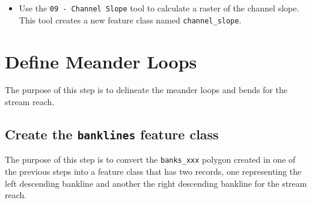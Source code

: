 \documentclass[]{book}
\providecommand{\tightlist}{%
  \setlength{\itemsep}{0pt}\setlength{\parskip}{0pt}}
\theoremstyle{definition}
\theoremstyle{definition}
\theoremstyle{definition}
\theoremstyle{remark}
\begin{document}
\begin{itemize}
\tightlist
\item
  Use the \texttt{09\ -\ Channel\ Slope} tool to calculate a raster of
  the channel slope. This tool creates a new feature class named
  \texttt{channel\_slope}.
\end{itemize}

\section{Define Meander Loops}\label{define-meander-loops}

The purpose of this step is to delineate the meander loops and bends for
the stream reach.

\subsection{\texorpdfstring{Create the \texttt{banklines} feature
class}{Create the banklines feature class}}\label{create-the-banklines-feature-class}

The purpose of this step is to convert the \texttt{banks\_xxx} polygon
created in one of the previous steps into a feature class that has two
records, one representing the left descending bankline and another the
right descending bankline for the stream reach.
\end{document}
